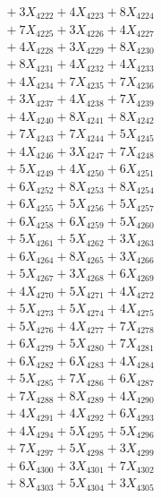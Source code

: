 \documentclass[a4paper,10pt]{article}
\begin{document}
{\begin{align}
&\;  + 3 X_{4222} + 4 X_{4223} + 8 X_{4224} \\[0.3ex]
&\;  + 7 X_{4225} + 3 X_{4226} + 4 X_{4227} \\[0.3ex]
&\;  + 4 X_{4228} + 3 X_{4229} + 8 X_{4230} \\[0.3ex]
&\;  + 8 X_{4231} + 4 X_{4232} + 4 X_{4233} \\[0.3ex]
&\;  + 4 X_{4234} + 7 X_{4235} + 7 X_{4236} \\[0.3ex]
&\;  + 3 X_{4237} + 4 X_{4238} + 7 X_{4239} \\[0.5ex]\allowbreak
&\;  + 4 X_{4240} + 8 X_{4241} + 8 X_{4242} \\[0.3ex]
&\;  + 7 X_{4243} + 7 X_{4244} + 5 X_{4245} \\[0.3ex]
&\;  + 4 X_{4246} + 3 X_{4247} + 7 X_{4248} \\[0.3ex]
&\;  + 5 X_{4249} + 4 X_{4250} + 6 X_{4251} \\[0.3ex]
&\;  + 6 X_{4252} + 8 X_{4253} + 8 X_{4254} \\[0.3ex]
&\;  + 6 X_{4255} + 5 X_{4256} + 5 X_{4257} \\[0.3ex]
&\;  + 6 X_{4258} + 6 X_{4259} + 5 X_{4260} \\[0.3ex]
&\;  + 5 X_{4261} + 5 X_{4262} + 3 X_{4263} \\[0.3ex]
&\;  + 6 X_{4264} + 8 X_{4265} + 3 X_{4266} \\[0.3ex]
&\;  + 5 X_{4267} + 3 X_{4268} + 6 X_{4269} \\[0.5ex]\allowbreak
&\;  + 4 X_{4270} + 5 X_{4271} + 4 X_{4272} \\[0.3ex]
&\;  + 5 X_{4273} + 5 X_{4274} + 4 X_{4275} \\[0.3ex]
&\;  + 5 X_{4276} + 4 X_{4277} + 7 X_{4278} \\[0.3ex]
&\;  + 6 X_{4279} + 5 X_{4280} + 7 X_{4281} \\[0.3ex]
&\;  + 6 X_{4282} + 6 X_{4283} + 4 X_{4284} \\[0.3ex]
&\;  + 5 X_{4285} + 7 X_{4286} + 6 X_{4287} \\[0.3ex]
&\;  + 7 X_{4288} + 8 X_{4289} + 4 X_{4290} \\[0.3ex]
&\;  + 4 X_{4291} + 4 X_{4292} + 6 X_{4293} \\[0.3ex]
&\;  + 4 X_{4294} + 5 X_{4295} + 5 X_{4296} \\[0.3ex]
&\;  + 7 X_{4297} + 5 X_{4298} + 3 X_{4299} \\[0.5ex]\allowbreak
&\;  + 6 X_{4300} + 3 X_{4301} + 7 X_{4302} \\[0.3ex]
&\;  + 8 X_{4303} + 5 X_{4304} + 3 X_{4305} \\[0.3ex]

\end{align}}
\end{document}
